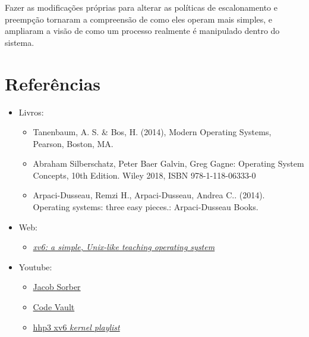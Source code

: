 \documentclass{article}
\begin{document}
Fazer as modificações próprias para alterar as políticas de escalonamento e
preempção tornaram a compreensão de como eles operam mais simples, e ampliaram
a visão de como um processo realmente é manipulado dentro do sistema.

\section{Referências}

\begin{itemize}
      \item Livros:
            \begin{itemize}
                  \item Tanenbaum, A. S. \& Bos, H. (2014), Modern Operating
                        Systems, Pearson, Boston, MA.
                  \item Abraham Silberschatz, Peter Baer Galvin, Greg Gagne:
                        Operating System Concepts, 10th Edition. Wiley 2018,
                        ISBN
                        978-1-118-06333-0
                  \item Arpaci-Dusseau, Remzi H., Arpaci-Dusseau, Andrea C..
                        (2014).
                        Operating systems: three easy pieces.: Arpaci-Dusseau
                        Books.
            \end{itemize}

      \item Web:
            \begin{itemize}
                  \item

                        \href{https://pdos.csail.mit.edu/6.828/2023/xv6/book-riscv-rev3.pdf}{\textit{xv6:
                                    a
                                    simple, Unix-like teaching operating
                                    system}}
            \end{itemize}

      \item Youtube:
            \begin{itemize}
                  \item \href{https://www.youtube.com/@JacobSorber}{Jacob
                              Sorber}
                  \item \href{https://www.youtube.com/@CodeVault}{Code Vault}
                  \item

                        \href{https://www.youtube.com/watch?v=fWUJKH0RNFE&list=PLbtzT1TYeoMhTPzyTZboW_j7TPAnjv9XB}{hhp3
                              xv6 \textit{kernel playlist}}
            \end{itemize}

\end{itemize}
\end{document}

